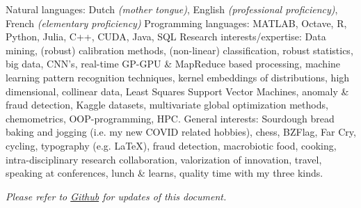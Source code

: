 \documentclass[10pt,a4paper]{article}
\begin{document}
\vspace{0.5em}
\inlineheadsection
{Natural languages:}
{Dutch \emph{(mother tongue)}, English \emph{(professional proficiency)}, French \emph{(elementary proficiency)}}
\vspace{0.5em}
\inlineheadsection
{Programming languages:}
{MATLAB, Octave, R, Python, Julia, C++, CUDA, Java, SQL} %
\vspace{0.5em}
\inlineheadsection	
{Research interests/expertise:}
{Data mining, (robust) calibration methods, (non-linear) classification, robust statistics, big data, CNN's, real-time GP-GPU \& MapReduce based processing, machine learning pattern recognition techniques, kernel embeddings of distributions, high dimensional, collinear data, Least Squares Support Vector Machines, anomaly \& fraud detection, Kaggle datasets, multivariate global optimization methods, chemometrics,  OOP-programming, HPC.}
\vspace{0.5em}
\inlineheadsection	
  {General interests:}
  {Sourdough bread baking and jogging (i.e. my new COVID related hobbies), chess, BZFlag, Far Cry, cycling, typography (e.g. \LaTeX), fraud detection, macrobiotic food, cooking, intra-disciplinary research collaboration, valorization of innovation, travel, speaking at conferences, lunch \& learns, quality time with my three kinds.}

\vspace{+2em} 
\begin{center}
	\emph{\small Please refer to \href{https://github.com/ivranckx/CV_Iwein_Vranckx/blob/main/iwein-vranckx-resume.pdf}{Github} for updates of this document.}
\end{center}
\spacedhrule{-0.2em}{-0.4em}
\end{document}
